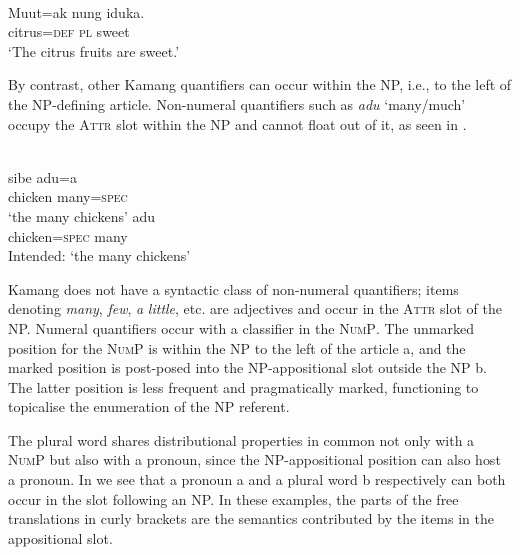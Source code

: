 \ea%
\label{ex:9:33}
 \\
\gll  Muut=ak nung iduka. \\
  citrus=\textsc{def} \textsc{pl} sweet   \\
\glt `The citrus fruits are sweet.'
\z






By contrast, other Kamang quantifiers can occur within the NP, i.e., to the left of the NP-defining article. Non-numeral quantifiers such as \textit{adu} `many/much' occupy the \textsc{Attr} slot within the NP and cannot float out of it, as seen in .


\ea%
\label{ex:9:34}
 \\
\ea
\gll sibe adu=a \\
  chicken many=\textsc{spec} \\
\glt `the many chickens' 
\ex
{} {adu} \\
chicken=\textsc{spec} many \\
\glt Intended: `the many chickens'
\z
\z



Kamang does not have a syntactic class of non-numeral quantifiers; items denoting \textit{many}, \textit{few}, \textit{a} \textit{little}, etc. are adjectives and occur in the \textsc{Attr} slot of the NP. Numeral quantifiers occur with a classifier in the \textsc{NumP}. The unmarked position for the \textsc{NumP} is within the NP to the left of the article a, and the marked position is post-posed into the NP-appositional slot outside the NP b. The latter position is less frequent and pragmatically marked, functioning to topicalise the enumeration of the NP referent.


The plural word shares distributional properties in common not only with a \textsc{NumP} but also with a pronoun, since the NP-appositional position can also host a pronoun. In  we see that a pronoun a and a plural word b respectively can both occur in the slot following an NP. In these examples, the parts of the free translations in curly brackets are the semantics contributed by the items in the appositional slot.


